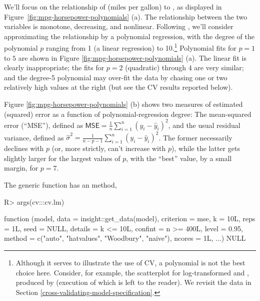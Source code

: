 \documentclass[
]{jss}
\begin{document}
We'll focus on the relationship of  (miles per gallon) to
, as displayed in
Figure~\ref{fig:mpg-horsepower-polynomials} (a). The relationship
between the two variables is monotone, decreasing, and nonlinear.
Following \citet{JamesEtAl:2021}, we'll consider approximating the
relationship by a polynomial regression, with the degree of the
polynomial \(p\) ranging from 1 (a linear regression) to 10.\footnote{Although
  it serves to illustrate the use of CV, a polynomial is not the best
  choice here. Consider, for example, the scatterplot for
  log-transformed  and , produced by
   (execution of
  which is left to the reader). We revisit the  data in
  Section \ref{cross-validating-model-specification}.} Polynomial fits
for \(p = 1\) to \(5\) are shown in Figure
\ref{fig:mpg-horsepower-polynomials} (a). The linear fit is clearly
inappropriate; the fits for \(p = 2\) (quadratic) through \(4\) are very
similar; and the degree-5 polynomial may over-fit the data by chasing
one or two relatively high  values at the right (but see the
CV results reported below).

Figure \ref{fig:mpg-horsepower-polynomials} (b) shows two measures of
estimated (squared) error as a function of polynomial-regression degree:
The mean-squared error (``MSE''), defined as
\(\mathsf{MSE} = \frac{1}{n}\sum_{i=1}^n (y_i - \widehat{y}_i)^2\), and
the usual residual variance, defined as
\(\widehat{\sigma}^2 = \frac{1}{n - p - 1} \sum_{i=1}^n (y_i - \widehat{y}_i)^2\).
The former necessarily declines with \(p\) (or, more strictly, can't
increase with \(p\)), while the latter gets slightly larger for the
largest values of \(p\), with the ``best'' value, by a small margin, for
\(p = 7\).

The generic  function has an  method,

\begin{CodeChunk}
\begin{CodeInput}
R> args(cv:::cv.lm)
\end{CodeInput}
\begin{CodeOutput}
function (model, data = insight::get_data(model), criterion = mse,
    k = 10L, reps = 1L, seed = NULL, details = k <= 10L, confint = n >=
        400L, level = 0.95, method = c("auto", "hatvalues", "Woodbury",
        "naive"), ncores = 1L, ...)
NULL
\end{CodeOutput}
\end{CodeChunk}
\end{document}
